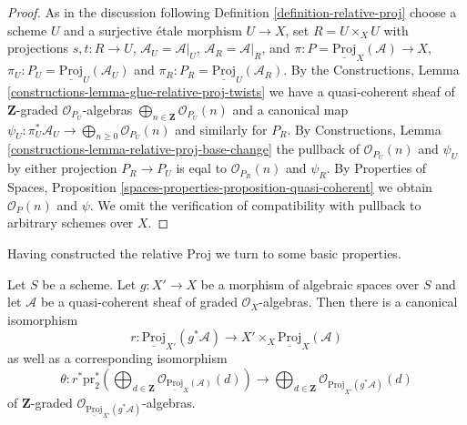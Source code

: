 \begin{proof}
As in the discussion following Definition \ref{definition-relative-proj}
choose a scheme $U$ and a surjective \'etale morphism
$U \to X$, set $R = U \times_X U$ with projections $s, t : R \to U$,
$\mathcal{A}_U = \mathcal{A}|_U$, $\mathcal{A}_R = \mathcal{A}|_R$,
and $\pi : P = \underline{\text{Proj}}_X(\mathcal{A}) \to X$,
$\pi_U : P_U = \underline{\text{Proj}}_U(\mathcal{A}_U)$ and
$\pi_R : P_R = \underline{\text{Proj}}_U(\mathcal{A}_R)$.
By the
Constructions, Lemma \ref{constructions-lemma-glue-relative-proj-twists}
we have a quasi-coherent sheaf of $\mathbf{Z}$-graded
$\mathcal{O}_{P_U}$-algebras
$\bigoplus_{n \in \mathbf{Z}} \mathcal{O}_{P_U}(n)$
and a canonical map
$\psi_U : \pi_U^*\mathcal{A}_U \to \bigoplus_{n \geq 0} \mathcal{O}_{P_U}(n)$
and similarly for $P_R$. By
Constructions, Lemma \ref{constructions-lemma-relative-proj-base-change}
the pullback of $\mathcal{O}_{P_U}(n)$ and $\psi_U$ by either projection
$P_R \to P_U$ is eqal to $\mathcal{O}_{P_R}(n)$ and $\psi_R$.
By Properties of Spaces, Proposition
\ref{spaces-properties-proposition-quasi-coherent}
we obtain $\mathcal{O}_{P}(n)$ and $\psi$.
We omit the verification of compatibility with pullback to
arbitrary schemes over $X$.
\end{proof}

\noindent
Having constructed the relative Proj we turn to some basic
properties.

\begin{lemma}
\label{lemma-relative-proj-base-change}
Let $S$ be a scheme. Let $g : X' \to X$ be a morphism of algebraic spaces
over $S$ and let $\mathcal{A}$ be a quasi-coherent sheaf
of graded $\mathcal{O}_X$-algebras. Then there is a canonical isomorphism
$$
r :
\underline{\text{Proj}}_{X'}(g^*\mathcal{A})
\longrightarrow
X' \times_X \underline{\text{Proj}}_X(\mathcal{A})
$$
as well as a corresponding isomorphism
$$
\theta :
r^*\text{pr}_2^*\left(\bigoplus\nolimits_{d \in \mathbf{Z}}
\mathcal{O}_{\underline{\text{Proj}}_X(\mathcal{A})}(d)\right)
\longrightarrow
\bigoplus\nolimits_{d \in \mathbf{Z}}
\mathcal{O}_{\underline{\text{Proj}}_{X'}(g^*\mathcal{A})}(d)
$$
of $\mathbf{Z}$-graded
$\mathcal{O}_{\underline{\text{Proj}}_{X'}(g^*\mathcal{A})}$-algebras.
\end{lemma}

